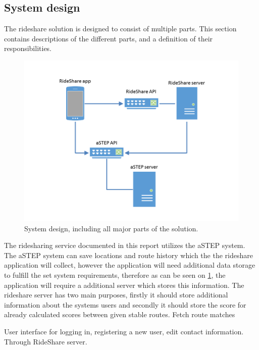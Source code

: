 \subsection{System design}
The rideshare solution is designed to consist of multiple parts.
This section contains descriptions of the different parts, and a definition of their responsibilities.

\begin{figure}[!h]
	\centering
	\includegraphics[width=\textwidth]{figures/SystemDesign.png}
	\caption{System design, including all major parts of the solution.}
	\label{fig:s2systemdesign}
\end{figure}

The ridesharing service documented in this report utilizes the aSTEP system.
The aSTEP system can save locations and route history which the the rideshare application will collect, however the application will need additional data storage to fulfill the set system requirements, therefore as can be seen on \ref{fig:s2systemdesign}, the application will require a additional server which stores this information.
The rideshare server has two main purposes, firstly it should store additional information about the systems users and secondly it should store the score for already calculated scores between given stable routes.
Fetch route matches

User interface for logging in, registering a new user, edit contact information.
Through RideShare server.

